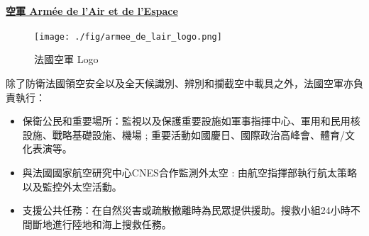 \documentclass[a4paper,14pt]{extarticle}
\theoremstyle{plain}
\theoremstyle{remark}
\numberwithin{equation}{section}
\begin{document}
%
%






\paragraph{\underline{空軍 Armée de l'Air et de l'Espace}}


\begin{wrapfigure}[10]{R}{0.35\textwidth}
  \centering
  \texttt{[image: ./fig/armee\_de\_lair\_logo.png]}
  \caption{法國空軍 Logo}
\end{wrapfigure}

除了防衛法國領空安全以及全天候識別、辨別和攔截空中載具之外，法國空軍亦負責執行：



\begin{itemize}
  \item %
    保衛公民和重要場所：監視以及保護重要設施如軍事指揮中心、軍用和民用核設施、戰略基礎設施、機場 ; 重要活動如國慶日、國際政治高峰會、體育/文化表演等。
  \item %
     與法國國家航空研究中心CNES合作監測外太空 : 由航空指揮部執行航太策略以及監控外太空活動。
  \item %


    支援公共任務：在自然災害或疏散撤離時為民眾提供援助。搜救小組24小時不間斷地進行陸地和海上搜救任務。
\end{itemize}
\end{document}
